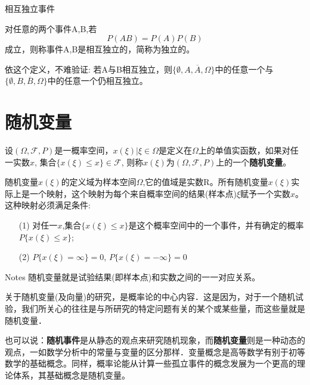 \begin{frame}{相互独立事件}
\begin{definition}
对任意的两个事件A,B,若
\[P(AB)=P(A)P(B)\]
成立，则称事件A,B是相互独立的，简称为独立的。	
\end{definition}
\begin{block}{依这个定义，不难验证:}
	若A与B相互独立，则$\{\emptyset,A,\overline{A},\Omega\}$中的任意一个与$\{\emptyset,B,\overline{B},\Omega\}$中的任意一个仍相互独立。
\end{block}
\end{frame}

\section{随机变量}

\begin{frame}
\begin{definition}
	设$(\Omega,\mathcal{F},P)$是一概率空间，$x(\xi)|\xi\in\Omega$是定义在$\Omega$上的单值实函数，如果对任一实数$x$, 集合$\{x(\xi)\le x\}\in\mathcal{F}$, 则称$x(\xi)$为$(\Omega,\mathcal{F},P)$上的一个\textbf{随机变量}。
	
	随机变量$x(\xi)$的定义域为样本空间$\Omega$,它的值域是实数R。所有随机变量$x(\xi)$实际上是一个映射，这个映射为每个来自概率空间的结果(样本点)$\xi$赋予一个实数$x$。这种映射必须满足条件:
	\begin{itemize}
		\item[(1)] 对任一$x$,集合$\{x(\xi)\le x\}$是这个概率空间中的一个事件，并有确定的概率$P\{x(\xi)\le x\}$;
		\item[(2)] $P\{x(\xi)=\infty \}=0$, $P\{x(\xi)=-\infty \}=0$
	\end{itemize}
	\begin{block}{Notes}
		随机变量就是试验结果(即样本点)和实数之间的一一对应关系。
	\end{block}
\end{definition}
\end{frame}

\begin{frame}
关于随机变量(及向量)的研究，是概率论的中心内容．这是因为，对于一个随机试验，我们所关心的往往是与所研究的特定问题有关的某个或某些量，而这些量就是随机变量．

也可以说：\textbf{随机事件}是从静态的观点来研究随机现象，而\textbf{随机变量}则是一种动态的观点，一如数学分析中的常量与变量的区分那样．变量概念是高等数学有别于初等数学的基础概念。同样，概率论能从计算一些孤立事件的概念发展为一个更高的理论体系，其基础概念是随机变量。
\end{frame}

